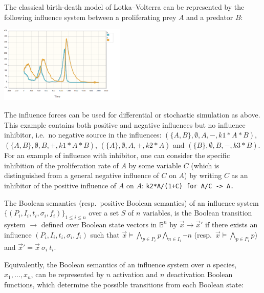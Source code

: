 \documentclass{llncs}
\newcommand{\lra}{\longrightarrow}
\begin{document}
\begin{example}\label{ex:LVi}
   The classical birth-death model of Lotka--Volterra can be represented by the following
influence system between a proliferating prey $A$ and a predator $B$:
  

\vspace{-2cm}\hfill\includegraphics[width=0.45\textwidth]{LVstoch.png}

The influence forces can be used for differential or stochastic simulation as above.
This example contains both positive and negative influences but no influence inhibitor, i.e.~no negative source in the influences:
$(\{A, B\}, \emptyset, A, -, k1*A*B)$, $(\{A, B\}, \emptyset, B, +, k1*A*B)$, $(\{A\}, \emptyset, A, +, k2*A)$ and $(\{B\}, \emptyset, B, -, k3*B)$.
For an example of influence with inhibitor, one can consider the specific inhibition of the proliferation rate of $A$ by some variable $C$
(which is distinguished from a general negative influence of $C$ on $A$) by writing $C$ as an inhibitor of the positive influence of $A$ on $A$:
\verb|k2*A/(1+C) for A/C -> A.|
\end{example}



\begin{definition}
   The Boolean semantics (resp.~positive Boolean semantics) of an influence system $\{(P_i, I_i, t_i, \sigma_i,
   f_i)\}_{1\leq i\leq n}$
   over a set $S$ of $n$ variables,
   is the Boolean transition system $\lra$ defined over Boolean state vectors in $\mathbb{B}^n$
   by
   ${\vec x}\lra{\vec x'}$ if there exists an influence $(P_i, I_i, t_i, \sigma_i, f_i)$
   such that ${\vec x}\models \bigwedge_{p\in P_i} p\bigwedge_{n\in I_i} \neg n$ (resp.~${\vec x}\models \bigwedge_{p\in P_i} p$)
   and ${\vec x'} = {\vec x}\ \sigma_i\ t_i$.
\end{definition}


Equivalently, the Boolean semantics of an influence system over $n$ species, $x_1,\ldots,x_n$,
can be represented by $n$ activation and $n$ deactivation Boolean functions, 
 which determine the possible transitions from each Boolean state:
\end{document}
